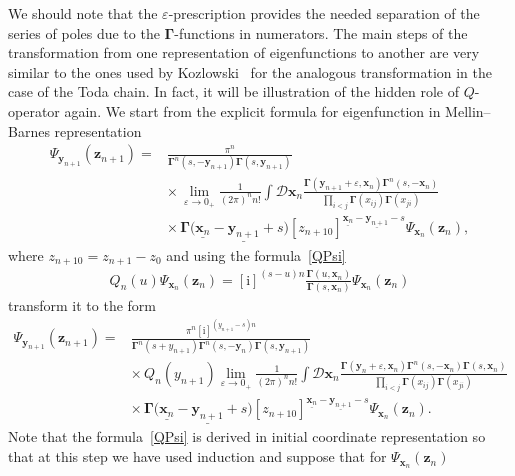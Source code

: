 \documentclass[pdftex]{sigma}
\renewcommand{\imath}{\mathrm{i}}
\numberwithin{equation}{section}
\begin{document}
We should note that the $\varepsilon$-prescription provides
the needed separation of the series of poles due to
the $\mathbf{\Gamma}$-functions in numerators.
The main steps of the transformation from one representation of
eigenfunctions to another are very similar to the ones used
by Kozlowski~\cite{KK} for the analogous transformation in the
case of the Toda chain. In fact, it will be illustration of the hidden
role of $Q$-operator again.
We start from the explicit formula for eigenfunction in Mellin--Barnes representation
\begin{align*}
\Psi_{\bm{y}_{n+1}}(\bm{z}_{n+1}) ={}&
\frac{\pi^n}{\mathbf{\Gamma}^{n}(s ,-\bm{y}_{n+1})
\mathbf{\Gamma}(s ,\bm{y}_{n+1})} \\
& {\times}\,
\lim\limits_{\varepsilon\to 0_+}
\frac{1}{(2\pi)^n n!} \int \mathcal{D}\bm{x}_{n}
\frac{\mathbf{\Gamma}(\bm y_{n+1}+\varepsilon,\bm x_{n})
\mathbf{\Gamma}^{n}(s ,-\bm{x}_{n})}
{\prod\limits_{i<j}\mathbf{\Gamma}(x_{ij})\mathbf{\Gamma}(x_{ji})} \\
& {\times}\,
\mathbf{\Gamma}\bigl(\underline{\bm{x}_{n}}-\underline{\bm{y}_{n+1}}+s\bigr)
[z_{n+1 0}]^{\underline{\bm{x}_{n}}-\underline{\bm{y}_{n+1}}-s}
\Psi_{\bm{x}_{n}}(\bm{z}_{n}) ,
\end{align*}
where $z_{n+1 0}= z_{n+1}-z_0$ and using the formula~\eqref{QPsi}
\begin{align*}
Q_n(u) \Psi_{\bm x_n}(\bm z_n)
= [\imath]^{(s-u)n} \frac{\mathbf{\Gamma}(u ,\bm{x}_n)}
{\mathbf{\Gamma}(s ,\bm{x}_n)} \Psi_{\bm x_n}(\bm z_n)
\end{align*}
transform it to the form
\begin{align*}
\Psi_{\bm{y}_{n+1}}(\bm{z}_{n+1}) ={}&
\frac{\pi^n [\imath]^{(y_{n+1}-s)n}}
{\mathbf{\Gamma}^{n}(s+y_{n+1})
\mathbf{\Gamma}^{n}(s ,-\bm{y}_{n})
\mathbf{\Gamma}(s ,\bm{y}_{n+1})} \\
& {\times}\, Q_n(y_{n+1})
\lim\limits_{\varepsilon\to 0_+}
\frac{1}{(2\pi)^n n!} \int \mathcal{D}\bm{x}_{n}
\frac{\mathbf{\Gamma}(\bm y_{n}+\varepsilon,\bm x_{n})
\mathbf{\Gamma}^{n}(s ,-\bm{x}_{n})\mathbf{\Gamma}(s ,\bm{x}_n)}
{\prod\limits_{i<j}\mathbf{\Gamma}(x_{ij})\mathbf{\Gamma}(x_{ji})} \\
& {\times}\,
\mathbf{\Gamma}\bigl(\underline{\bm{x}_{n}}-\underline{\bm{y}_{n+1}}+s\bigr)
[z_{n+1 0}]^{\underline{\bm{x}_{n}}-\underline{\bm{y}_{n+1}}-s}
\Psi_{\bm{x}_{n}}(\bm{z}_{n}) .
\end{align*}
Note that the formula~\eqref{QPsi} is derived in initial
coordinate representation so that at this step we have
used induction and suppose that for $\Psi_{\bm{x}_{n}}(\bm{z}_{n})$
\end{document}
